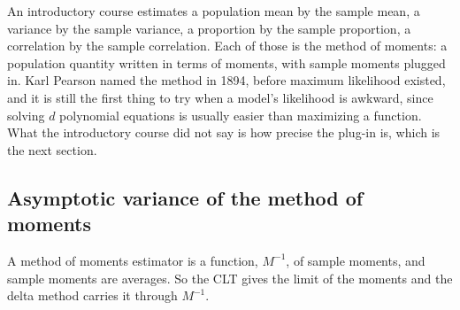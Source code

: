 \begin{bridge}
An introductory course estimates a population mean by the sample mean, a variance by the sample variance, a proportion by the sample proportion, a correlation by the sample correlation.
Each of those is the method of moments: a population quantity written in terms of moments, with sample moments plugged in.
Karl Pearson named the method in 1894, before maximum likelihood existed, and it is still the first thing to try when a model's likelihood is awkward, since solving $d$ polynomial equations is usually easier than maximizing a function.
What the introductory course did not say is how precise the plug-in is, which is the next section.
\end{bridge}

\subsection{Asymptotic variance of the method of moments}
\label{sec:mom-variance}


A method of moments estimator is a function, $M^{-1}$, of sample moments, and sample moments are averages.
So the CLT gives the limit of the moments and the delta method carries it through $M^{-1}$.

